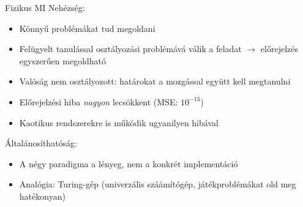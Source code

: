 \begin{frame}{Fizikus MI}
    Nehézség: 
    \begin{itemize}
        \item Könnyű problémákat tud megoldani
        \item Felügyelt tanulással osztályozási problémává válik a feladat $\rightarrow$ előrejelzés egyszerűen megoldható
        \item Valóság nem osztályozott: határokat a mozgással együtt kell megtanulni
        \item Előrejelzési hiba {\it nagyon} lecsökkent (MSE: $10^{-13}$)
        \item Kaotikus rendszerekre is működik ugyanilyen hibával
    \end{itemize}
    
    Általánosíthatóság:
    \begin{itemize}
        \item A négy paradigma a lényeg, nem a konkrét implementáció
        \item Analógia: Turing-gép (univerzális száámítógép, játékproblémákat old meg hatékonyan)
    \end{itemize}
\end{frame}
